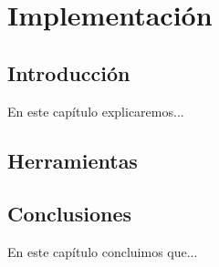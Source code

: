 \chapter{Implementación}\label{cap:implementacion}

\section{Introducción}
En este capítulo explicaremos...

\section {Herramientas}

\section{Conclusiones}
En este capítulo concluimos que...